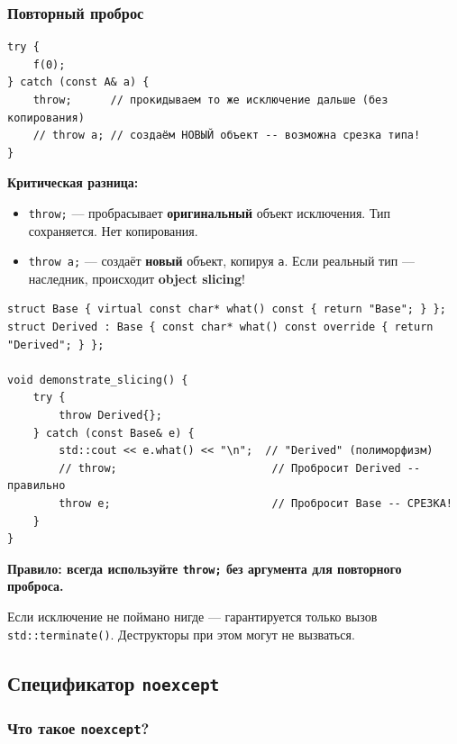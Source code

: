 \documentclass[a4paper,12pt]{article}
\begin{document}
\subsubsection{Повторный проброс}

\begin{lstlisting}
try {
    f(0);
} catch (const A& a) {
    throw;      // прокидываем то же исключение дальше (без копирования)
    // throw a; // создаём НОВЫЙ объект -- возможна срезка типа!
}
\end{lstlisting}

\textbf{Критическая разница:}
\begin{itemize}
    \item \texttt{throw;} --- пробрасывает \textbf{оригинальный} объект исключения.
          Тип сохраняется. Нет копирования.
    \item \texttt{throw a;} --- создаёт \textbf{новый} объект, копируя \texttt{a}.
          Если реальный тип --- наследник, происходит \textbf{object slicing}!
\end{itemize}

\begin{lstlisting}
struct Base { virtual const char* what() const { return "Base"; } };
struct Derived : Base { const char* what() const override { return "Derived"; } };

void demonstrate_slicing() {
    try {
        throw Derived{};
    } catch (const Base& e) {
        std::cout << e.what() << "\n";  // "Derived" (полиморфизм)
        // throw;                        // Пробросит Derived -- правильно
        throw e;                         // Пробросит Base -- СРЕЗКА!
    }
}
\end{lstlisting}

\textbf{Правило: всегда используйте \texttt{throw;} без аргумента для повторного
проброса.}

Если исключение не поймано нигде --- гарантируется только вызов
\texttt{std::terminate()}. Деструкторы при этом могут не вызваться.

\subsection{Спецификатор \texttt{noexcept}}

\subsubsection{Что такое \texttt{noexcept}?}
\end{document}
